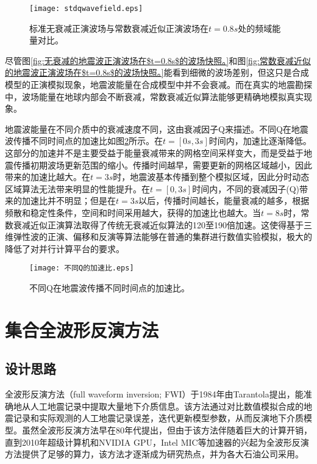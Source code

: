\begin{figure}[ht]
\centering
\texttt{[image: stdqwavefield.eps]}
\caption{标准无衰减正演波场与常数衰减近似正演波场在$t=0.8s$处的频域能量对比。}
\label{fig:stdqwavefield}
\end{figure}

尽管图\ref{fig:无衰减的地震波正演波场在$t=0.8s$的波场快照。}和图\ref{fig:常数衰减近似的地震波正演波场在$t=0.8s$的波场快照。}能看到细微的波场差别，但这只是合成模型的正演模拟现象，地震波能量在合成模型中并不会衰减。而在真实的地震勘探中，波场能量在地球内部会不断衰减，常数衰减近似算法能够更精确地模拟真实现象。

地震波能量在不同介质中的衰减速度不同，这由衰减因子Q来描述。不同Q在地震波传播不同时间点的加速比如图\ref{fig:diffqspeedup}所示。在$t=[0s,3s]$时间内，加速比逐渐降低。这部分的加速并不是主要受益于能量衰减带来的网格空间采样变大，而是受益于地震传播初期波场更新范围的缩小。传播时间越早，需要更新的网格区域越小，因此带来的加速比越大。在$t=3s$时，地震波基本传播到整个模拟区域，因此分时动态区域算法无法带来明显的性能提升。在$t=[0,3s]$时间内，不同的衰减因子(Q)带来的加速比并不明显；但是在$t=3s$以后，传播时间越长，能量衰减的越多，根据频散和稳定性条件，空间和时间采用越大，获得的加速比也越大。当$t=8s$时，常数衰减近似正演算法取得了传统无衰减近似算法的120至190倍加速。这使得基于三维弹性波的正演、偏移和反演等算法能够在普通的集群进行数值实验模拟，极大的降低了对并行计算平台的要求。

\begin{figure}[ht]
\centering
\texttt{[image: 不同Q的加速比.eps]}
\caption{不同Q在地震波传播不同时间点的加速比。}
\label{fig:diffqspeedup}
\end{figure}


\section{集合全波形反演方法}

\subsection{设计思路}
全波形反演方法（full waveform inversion; FWI）于1984年由Tarantola提出，能准确地从人工地震记录中提取大量地下介质信息\cite{tarantola1984inversion,plessix2012full,brossier2009seismic}。该方法通过对比数值模拟合成的地震记录和实际观测的人工地震记录误差，迭代更新模型参数，从而反演地下介质模型\cite{yushu}。虽然全波形反演方法早在80年代提出，但由于该方法伴随着巨大的计算开销，直到2010年超级计算机和NVIDIA GPU，Intel MIC等加速器的兴起为全波形反演方法提供了足够的算力，该方法才逐渐成为研究热点，并为各大石油公司采用。

